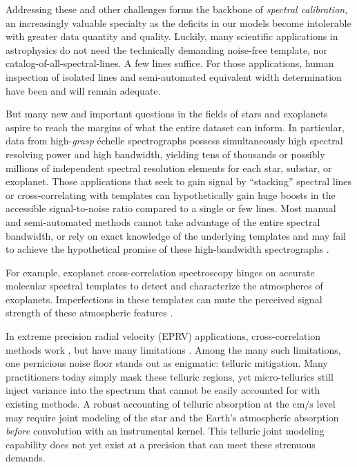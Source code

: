 \documentclass[modern]{aastex631}
\begin{document}
Addressing these and other challenges forms the backbone of \emph{spectral calibration}, an increasingly valuable specialty as the deficits in our models become intolerable with greater data quantity and quality.  Luckily, many scientific applications in astrophysics do not need the technically demanding noise-free template, nor catalog-of-all-spectral-lines.  A few lines suffice.  For those applications, human inspection of isolated lines and semi-automated equivalent width determination have been and will remain adequate.

But many new and important questions in the fields of stars and exoplanets aspire to reach the margins of what the entire dataset can inform.  In particular, data from high-\emph{grasp} \'echelle spectrographs possess simultaneously high spectral resolving power and high bandwidth, yielding tens of thousands or possibly millions of independent spectral resolution elements for each star, substar, or exoplanet.  Those applications that seek to gain signal by ``stacking'' spectral lines or cross-correlating with templates can hypothetically gain huge boosts in the accessible signal-to-noise ratio compared to a single or few lines.  Most manual and semi-automated methods cannot take advantage of the entire spectral bandwidth, or rely on exact knowledge of the underlying templates and may fail to achieve the hypothetical promise of these high-bandwidth spectrographs \citep{2020AJ....160..198H}.

For example, exoplanet cross-correlation spectroscopy \citep{2013MNRAS.436L..35B} hinges on accurate molecular spectral templates to detect and characterize the atmospheres of exoplanets.  Imperfections in these templates can mute the perceived signal strength of these atmospheric features \citep{2015A&A...575A..20H}.

In extreme precision radial velocity (EPRV) applications, cross-correlation methods work \citep{2018A_A...620A..47D}, but have many limitations \citep{2022arXiv220110639Z}.  Among the many such limitations, one pernicious noise floor stands out as enigmatic: telluric mitigation.  Many practitioners today simply mask these telluric regions, yet micro-tellurics still inject variance into the spectrum that cannot be easily accounted for with existing methods.  A robust accounting of telluric absorption at the $\mathrm{cm/s}$ level may require joint modeling of the star and the Earth's atmospheric absorption \emph{before} convolution with an instrumental kernel.  This telluric joint modeling capability does not yet exist at a precision that can meet these strenuous demands.
\end{document}
